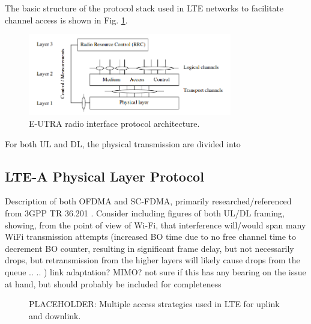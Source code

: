 The basic structure of the protocol stack used in LTE networks to facilitate channel access is shown in Fig. \ref{figs:stack}.
\begin{figure}[!ht]
	\centering
	\includegraphics[width=3.5in]{figures3/protocolStack}
	\caption{E-UTRA radio interface protocol architecture.}
	\label{figs:stack}
\end{figure}
For both UL and DL, the physical transmission are divided into 

\subsection{LTE-A Physical Layer Protocol}
\label{lte-phy}
Description of both OFDMA and SC-FDMA, primarily researched/referenced from 3GPP TR 36.201 \cite{tr36201}. Consider including figures of both UL/DL framing, showing, from the point of view of Wi-Fi, that interference will/would span many WiFi transmission attempts (increased BO time due to no free channel time to decrement BO counter, resulting in significant frame delay, but not necessarily drops, but retransmission from the higher layers will likely cause drops from the queue .. ..  )  link adaptation? MIMO? not sure if this has any bearing on the issue at hand, but should probably be included for completeness
\begin{figure}[!ht] 
	\centering
	\hfil
	\caption{PLACEHOLDER: Multiple access strategies used in LTE for uplink and downlink.}
	\label{fig:ofdma_sc-fdma_comp}
\end{figure}



